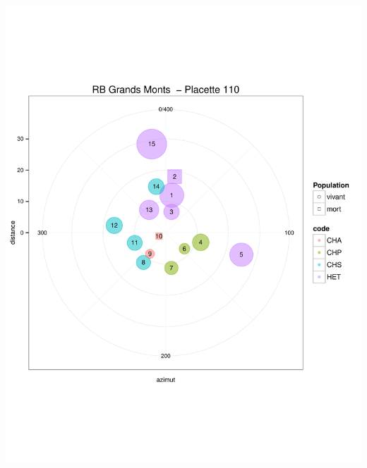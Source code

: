 \documentclass[a4paper]{book}\usepackage[]{graphicx}\usepackage[]{color}
\makeatletter
\def\maxwidth{ %
  \ifdim\Gin@nat@width>\linewidth
    \linewidth
  \else
    \Gin@nat@width
  \fi
}
\newenvironment{knitrout}{}{} %
\makeatother
\begin{document}
\begin{knitrout}
{\centering \includegraphics[width=\maxwidth]{Figures/PlanArbres-2} 

}





\end{knitrout}
\end{document}
